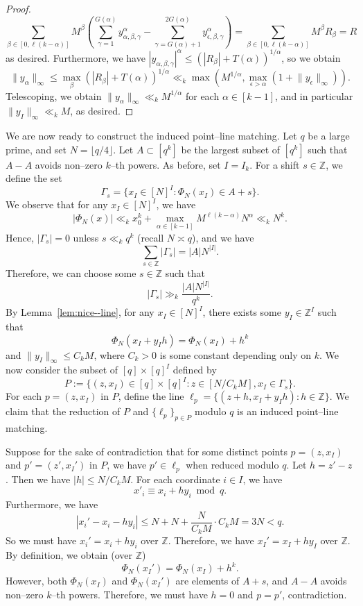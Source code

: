 \documentclass[12pt,reqno]{amsart}
\theoremstyle{plain}
\theoremstyle{definition}
\newcommand{\Z}{\mathbb{Z}}
\newcommand{\1}{\mathbf{1}}
\newcommand{\abs}[1]{\left|#1\right|}
\newcommand{\infnorm}[1]{\lVert #1 \rVert_\infty}
\begin{document}
\begin{proof}
    $$\sum_{\beta \in [0, \ell (k - \alpha)]} M^{\beta} \left(\sum_{\gamma = 1}^{G(\alpha)} y_{\alpha, \beta, \gamma}^{\alpha} -  \sum_{\gamma = G(\alpha) + 1}^{2G(\alpha)} y_{\epsilon, \beta, \gamma}^{\alpha}\right) = \sum_{\beta \in [0, \ell (k - \alpha)]} M^{\beta} R_{\beta} = R$$
    as desired. Furthermore, we have $\abs{y_{\alpha, \beta, \gamma}}^{\alpha} \leq (\abs{R_{\beta}} + T(\alpha))^{1 / \alpha}$, so we obtain
    $$\infnorm{y_{\alpha}} \leq \max_{\beta} (\abs{R_{\beta}} + T(\alpha))^{1 / \alpha} \ll_k \max\left(M^{1 / \alpha}, \max_{\epsilon > \alpha}(1 + \infnorm{y_{\epsilon}})\right).$$
    Telescoping, we obtain $\infnorm{y_{\alpha}} \ll_k M^{1 / \alpha}$ for each $\alpha \in [k - 1]$, and in particular $\infnorm{y_{I}} \ll_k M$, as desired.
\end{proof}
We are now ready to construct the induced point--line matching. Let $q$ be a large prime, and set $N = \lfloor{q / 4\rfloor}$. Let $A \subset [q^k]$ be the largest subset of $[q^k]$ such that $A - A$ avoids non--zero $k$--th powers. As before, set $I = I_k$. For a shift $s \in \mathbb{Z}$, we define the set
$$\Gamma_s = \{x_I \in [N]^{I}: \Phi_N(x_I) \in A + s\}.$$
We observe that for any $x_I \in [N]^{I}$, we have
$$\abs{\Phi_N(x)} \ll_k x_0^{k} + \max_{\alpha \in [k - 1]} M^{\ell (k - \alpha)} N^{\alpha} \ll_k N^k.$$
Hence, $\abs{\Gamma_s} = 0$ unless $s \ll_k q^k$ (recall $N \asymp q$), and we have
$$\sum_{s \in \Z} \abs{\Gamma_s} = |A| N^{|I|}.$$
Therefore, we can choose some $s \in \Z$ such that
$$\abs{\Gamma_s} \gg_k \frac{|A| N^{|I|}}{q^k}.$$
By Lemma~\ref{lem:nice--line}, for any $x_I \in [N]^I$, there exists some $y_I \in \Z^I$ such that 
$$\Phi_N(x_I + y_I h) = \Phi_N(x_I) + h^k$$
and $\infnorm{y_I} \leq C_k M$, where $C_k > 0$ is some constant depending only on $k$.
We now consider the subset of $[q] \times [q]^{I}$ defined by
$$P := \{(z, x_I) \in [q] \times [q]^I: z \in [N / C_k M], x_I \in \Gamma_s\}.$$
For each $p = (z, x_I)$ in $P$, define the line $\ell_p = \{(z + h, x_I + y_I h): h \in \Z\}$. We claim that the reduction of $P$ and $\{\ell_p\}_{p \in P}$ modulo $q$ is an induced point--line matching.

Suppose for the sake of contradiction that for some distinct points $p = (z, x_I)$ and $p' = (z', x_I')$ in $P$, we have $p' \in \ell_{p}$ when reduced modulo $q$. Let $h = z' - z$. Then we have $\abs{h} \leq N / C_k M$. For each coordinate $i \in I$, we have
$$x'_i \equiv x_i + hy_i \bmod{q}.$$
Furthermore, we have
$$\abs{x_i' - x_i -hy_i} \leq N + N + \frac{N}{C_k M} \cdot C_k M  = 3N < q.$$
So we must have $x_i' = x_i + hy_i$ over $\Z$. Therefore, we have $x_I' = x_I + hy_I$ over $\Z$. By definition, we obtain (over $\Z$)
$$\Phi_N(x_I') = \Phi_N(x_I) + h^k.$$
However, both $\Phi_N(x_I)$ and $\Phi_N(x_I')$ are elements of $A + s$, and $A - A$ avoids non--zero $k$--th powers. Therefore, we must have $h = 0$ and $p = p'$, contradiction.
\end{document}
